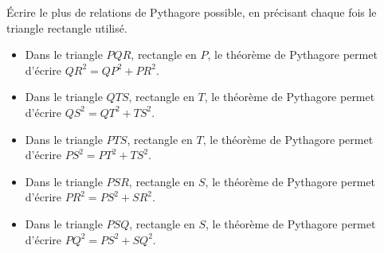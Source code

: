    Écrire le plus de relations de Pythagore possible, en précisant chaque fois le triangle rectangle utilisé.


    {\red
    \begin{itemize}
        \item Dans le triangle $PQR$, rectangle en $P$, le théorème de Pythagore permet d'écrire $QR^2=QP^2+PR^2$.
        \item Dans le triangle $QTS$, rectangle en $T$, le théorème de Pythagore permet d'écrire $QS^2=QT^2+TS^2$.
        \item Dans le triangle $PTS$, rectangle en $T$, le théorème de Pythagore permet d'écrire $PS^2=PT^2+TS^2$.
        \item Dans le triangle $PSR$, rectangle en $S$, le théorème de Pythagore permet d'écrire $PR^2=PS^2+SR^2$.
        \item Dans le triangle $PSQ$, rectangle en $S$, le théorème de Pythagore permet d'écrire $PQ^2=PS^2+SQ^2$.
    \end{itemize}
    }
